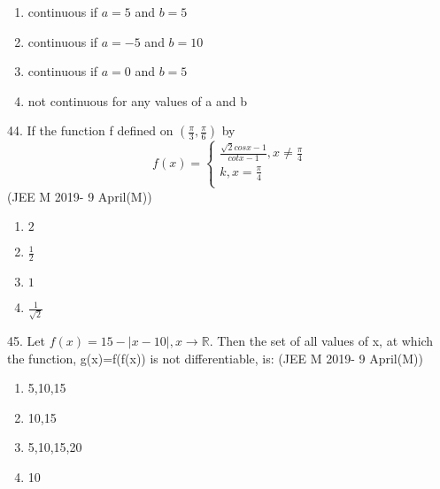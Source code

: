 \documentclass[journal,12pt,twocolumn]{IEEEtran}
\theoremstyle{remark}
\begin{document}
\begin{enumerate}[label=(\alph*)]
\item continuous if $a=5$ and $b=5$
\item continuous if $a=-5$ and $b=10$
\item continuous if $a=0$ and $b=5$
\item not continuous for any values of a and b
\end{enumerate}
44. If the function f defined on $ \left( \frac{\pi}{3}, \frac{\pi}{6}\right)$ by
\begin{equation}
    f(x)= 
    \begin{cases}
    \frac{\sqrt{2} cosx-1}{cotx-1}, x \ne \frac{\pi}{4}\\
    k, x = \frac{\pi}{4}\\
    \end{cases}
\end{equation}
\hfill{(JEE M 2019- 9 April(M))}
\begin{enumerate}[label=(\alph*)]
\item $2$
\item $\frac{1}{2}$
\item $1$
\item $\frac{1}{\sqrt{2}}$
\end{enumerate}
45. Let $f(x)= 15-|x-10|, x\to\mathbb{R}$. Then the set of all values of x, at which the function, g(x)=f(f(x)) is not differentiable, is:
\hfill{(JEE M 2019- 9 April(M))}
\begin{enumerate}[label=(\alph*)]
\item {5,10,15}
\item {10,15}
\item {5,10,15,20}
\item {10}
\end{enumerate}
\end{document}
